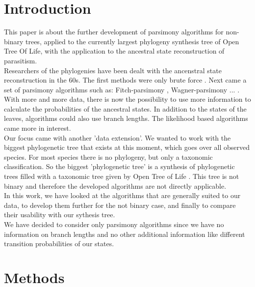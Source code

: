 \chapter{Introduction}
  This paper is about the further development of parsimony algorithms for non-binary trees, applied 
  to the currently largest phylogeny synthesis tree of Open Tree Of Life, with the application to 
  the ancestral state reconstruction of parasitism. \\
  Researchers of the phylogenies have been dealt with the ancenstral state reconstruction in the 
  60s. The first methods were only brute force . 
  Next came a set of parsimony algorithms such as: Fitch-parsimony \cite{Fitch1971}, 
  Wagner-parsimony \cite{Swofford1987} ... . \\
  With more and more data, there is now the possibility to use more information to calculate the 
  probabilities of the ancestral states. In addition to the states of the leaves, algorithms could 
  also use branch lengths. The likelihood based algorithms came more in interest. \\
  Our focus came with another 'data extension'. We wanted to work with the biggest phylogenetic tree 
  that exists at this moment, which goes over all observed species. For most  species 
  there is no 
  phylogeny, but only a taxonomic classification. So the biggest 'phylogenetic tree' is a synthesis 
  of phylogenetic trees filled with a taxonomic tree given by Open Tree of Life \cite{Hinchliff2015}.
  This tree is not binary and therefore the developed algorithms are not directly applicable. \\
  In this work, we have looked at the algorithms that are generally suited to our data, to develop 
  them further for the not binary case, and finally to compare their usability with our sythesis 
  tree. \\
  We have decided to consider only parsimony algorithms since we have no information on branch 
  lengths and no other additional information like different transition probabilities of our states.

\chapter{Methods}
  
